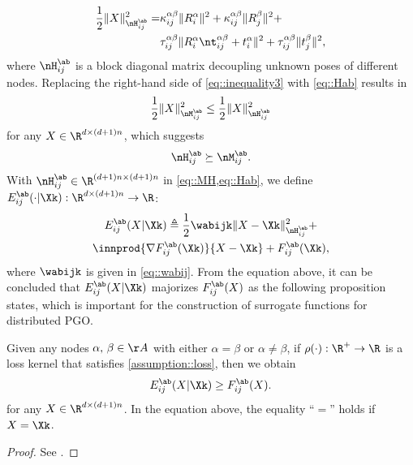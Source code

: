 \begin{equation}\label{eq::Hab}
\begin{aligned}
\frac{1}{2}\|X\|_{\nH_{ij}^{\ab}}^2
=&\kappa_{ij}^{\alpha\beta}\|R_i^\alpha\|^2+\kappa_{ij}^{\alpha\beta}\|R_j^\beta\|^2+\\
 &\tau_{ij}^{\alpha\beta}\|R_i^\alpha \nt_{ij}^{\alpha\beta}+t_i^\alpha\|^2+\tau_{ij}^{\alpha\beta}\|t_j^\beta\|^2,
\end{aligned}
\end{equation}
where $\nH_{ij}^{\ab}$ is a block diagonal matrix decoupling unknown poses of different nodes. Replacing the right-hand side of \cref{eq::inequality3} with \cref{eq::Hab} results in
\begin{equation}
\nonumber
 \frac{1}{2}\|X\|_{\nM_{ij}^{\ab}}^2 \leq \frac{1}{2}\|X\|_{\nH_{ij}^{\ab}}^2
\end{equation}
for any $X\in\R^{d\times(d+1)n}$, which suggests 
\begin{equation}\label{eq::MH}
\nH_{ij}^{\ab}\succeq\nM_{ij}^{\ab}.
\end{equation}
With $\nH_{ij}^{\ab}\in\R^{(d+1)n\times(d+1)n}$ in \cref{eq::MH,eq::Hab}, we define $E_{ij}^{\ab}(\cdot|\Xk):\R^{d\times(d+1)n}\rightarrow \R$:
\begin{multline}\label{eq::Eab}
E_{ij}^{\ab}(X|\Xk)\triangleq \frac{1}{2}\wabijk\|X-\Xk\|_{\nH_{ij}^{\ab}}^2+\\
\innprod{\nabla F_{ij}^{\ab}(\Xk)}{X-\Xk}+ F_{ij}^{\ab}(\Xk),
\end{multline}
where $\wabijk$ is given in \cref{eq::wabij}. From the equation above, it can be concluded that $E_{ij}^{\ab}(X|\Xk)$ majorizes $F_{ij}^{\ab}(X)$  as the following proposition states, which is important for the construction of surrogate functions for distributed PGO.

\begin{prop}\label{prop::upper}
	Given any nodes $\alpha,\,\beta\in \AA$ with either $\alpha = \beta$ or $\alpha\neq\beta$, if $\rho(\cdot):\R^+\rightarrow \R$ is a loss kernel that satisfies \cref{assumption::loss}, then we obtain
	\begin{equation}\label{eq::EF}
	E_{ij}^{\ab}(X|\Xk)\geq F_{ij}^{\ab}(X).
	\end{equation} 
	for any $X\in \R^{d\times(d+1)n}$. In the equation above, the equality ``$=$'' holds if $X=\Xk$.
\end{prop}
\begin{proof}
	See .
\end{proof}

